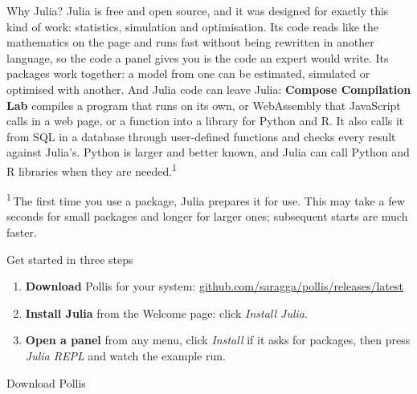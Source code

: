 \documentclass[10pt,a4paper]{article}
\newcommand{\downloadlink}{\href{https://github.com/saragga/pollis/releases/latest}{github.com/saragga/pollis/releases/latest}}
\begin{document}
\vspace{3mm}
\begin{pbox}{Why Julia?}
Julia is free and open source, and it was designed for exactly this kind of work:
statistics, simulation and optimisation. Its code reads like the mathematics on the page
and runs fast without being rewritten in another language, so the code a panel gives you
is the code an expert would write. Its packages work together: a model from one can be
estimated, simulated or optimised with another. And Julia code can leave Julia:
\textbf{Compose \textrightarrow{} Compilation Lab} compiles a program that runs on its own, or WebAssembly that
JavaScript calls in a web page, or a function into a library for Python and R. It also calls it from SQL in a
database through user-defined functions and checks every result against Julia's. Python is larger and better known, and
Julia can call Python and R libraries when they are needed.\textsuperscript{1}\par\smallskip
{\footnotesize\color{soft}\textsuperscript{1}\,The first time you use a package, Julia prepares it for use.
This may take a few seconds for small packages and longer for larger ones; subsequent starts are much faster.}
\end{pbox}

\vspace{3mm}
\begin{nbox}{Get started in three steps}
\begin{minipage}[t]{0.70\linewidth}
\begin{enumerate}[label={\color{amber}\bfseries\arabic*}, leftmargin=5mm, itemsep=2pt]
  \item \textbf{Download} Pollis for your system: \textcolor{amber}{\downloadlink}
  \item \textbf{Install Julia} from the Welcome page: click \emph{Install Julia}.
  \item \textbf{Open a panel} from any menu, click \emph{Install} if it asks for packages,
    then press \emph{Julia REPL} and watch the example run.
\end{enumerate}
\end{minipage}\hfill
\begin{minipage}[t]{0.25\linewidth}\vspace{0pt}\centering
\colorbox{white}{\color{black}}\par\vspace{2pt}
{\footnotesize Download Pollis}
\end{minipage}
\end{nbox}
\end{document}
